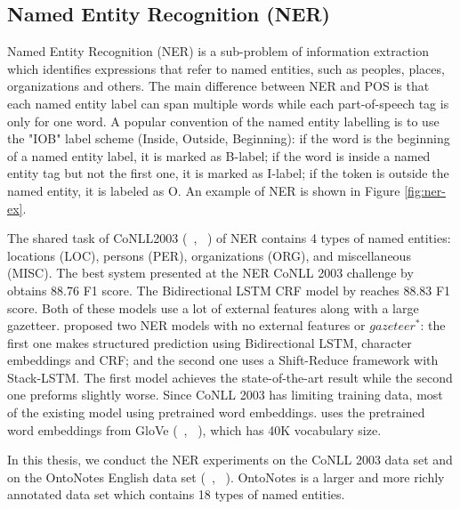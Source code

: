 \documentclass{sfuthesis}
\begin{document}



\subsection{Named Entity Recognition (NER)}

Named Entity Recognition (NER) is a sub-problem of
information extraction which identifies expressions
that refer to named entities, such as peoples, places, organizations and others. The main difference between NER and POS is that each named entity label can span multiple words while each part-of-speech tag is only for one word. A popular convention of the named entity labelling is to use the "IOB" label scheme (Inside, Outside, Beginning): if the word is the beginning of a named entity label, it is marked as B-label; if the word is inside a named entity tag but not the first one, it is marked as I-label; if the token is outside the named entity, it is labeled as O. An example of NER is shown in Figure \ref{fig:ner-ex}.

The shared task of CoNLL2003 (~\citeauthor{tjong2003introduction}, ~\citeyear{tjong2003introduction}) of NER contains 4 types of named entities: locations (LOC), persons (PER), organizations (ORG), and miscellaneous (MISC).
The best system presented at the NER CoNLL 2003 challenge by \cite{florian2003named} obtains 88.76 F1 score. The Bidirectional LSTM CRF model by \cite{huang2015bidirectional} reaches 88.83 F1 score. Both of these models use a lot of external features along with a large gazetteer. \cite{lample2016neural} proposed two NER models with no external features or $gazeteer^{\ast}$: the first one makes structured prediction using Bidirectional LSTM, character embeddings and CRF; and the second one uses a Shift-Reduce framework with Stack-LSTM. The first model achieves the state-of-the-art result while the second one preforms slightly worse. Since CoNLL 2003 has limiting training data, most of the existing model using pretrained word embeddings. \cite{lample2016neural} uses the pretrained word embeddings from GloVe (~\citeauthor{pennington2014glove}, ~\citeyear{pennington2014glove}), which has 40K vocabulary size.


In this thesis, we conduct the NER experiments on the CoNLL 2003 data set and on the OntoNotes English data set (~\citeauthor{hovy2006ontonotes}, ~\citeyear{hovy2006ontonotes}). OntoNotes is a larger and more richly annotated data set which contains 18 types of named entities. 
\end{document}
